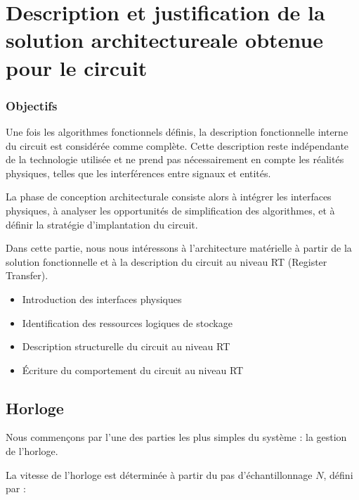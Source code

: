 \section{Description et justification de la solution architectureale obtenue pour le circuit}

\subsubsection*{Objectifs}

Une fois les algorithmes fonctionnels définis, la description fonctionnelle interne du circuit est considérée comme complète. Cette description reste indépendante de la technologie utilisée et ne prend pas nécessairement en compte les réalités physiques, telles que les interférences entre signaux et entités.
\newline

La phase de conception architecturale consiste alors à intégrer les interfaces physiques, à analyser les opportunités de simplification des algorithmes, et à définir la stratégie d’implantation du circuit.
\newline

Dans cette partie, nous nous intéressons à l’architecture matérielle à partir de la solution fonctionnelle et à la description du circuit au niveau RT (Register Transfer).  
\newline

\begin{itemize}
    \item Introduction des interfaces physiques
    \item Identification des ressources logiques de stockage
    \item Description structurelle du circuit au niveau RT
    \item Écriture du comportement du circuit au niveau RT
\end{itemize}

\vspace{20px}

\subsection{Horloge}

Nous commençons par l’une des parties les plus simples du système : la gestion de l’horloge.

La vitesse de l’horloge est déterminée à partir du pas d’échantillonnage \(N\), défini par :

